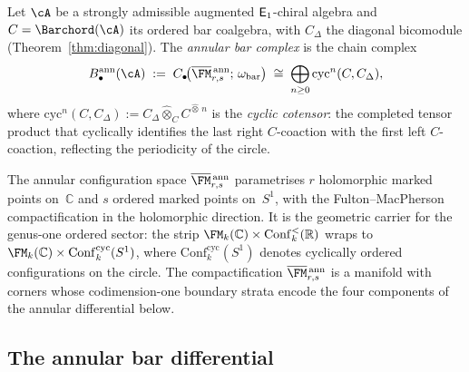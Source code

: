 \begin{definition}%
\ClaimStatusProvedHere
\label{def:annular-bar}%
%
%
Let $\cA$ be a strongly admissible augmented $\mathsf{E}_1$-chiral
algebra and $C=\Barchord(\cA)$ its ordered
bar coalgebra, with $C_\Delta$ the diagonal bicomodule
(Theorem~\ref{thm:diagonal}).
The \emph{annular bar complex} is the chain complex
\[
B^{\mathrm{ann}}_\bullet(\cA)
\;:=\;
C_\bullet\!\bigl(
 \overline{\FM}{}^{\,\mathrm{ann}}_{r,s};\,
 \omega_{\mathrm{bar}}
\bigr)
\;\cong\;
\bigoplus_{n\ge 0}
 \mathrm{cyc}^n(C,C_\Delta),
\]
where $\mathrm{cyc}^n(C,C_\Delta):=
C_\Delta\widehat\otimes_C C^{\widehat\otimes\,n}$ is the
\emph{cyclic cotensor}:
the completed tensor product that cyclically identifies the
last right $C$-coaction with the first left $C$-coaction,
reflecting the periodicity of the circle.
\end{definition}

The annular configuration space
$\overline{\FM}{}^{\,\mathrm{ann}}_{r,s}$ parametrises
$r$ holomorphic marked points on~$\mathbb{C}$ and $s$ ordered
marked points on~$S^1$, with the Fulton--MacPherson
compactification in the holomorphic direction. It is the
geometric carrier for the genus-one ordered sector: the strip
$\FM_k(\mathbb{C})\times\mathrm{Conf}_k^{<}(\mathbb{R})$ wraps to
$\FM_k(\mathbb{C})\times\mathrm{Conf}_k^{\mathrm{cyc}}(S^1)$,
where $\mathrm{Conf}_k^{\mathrm{cyc}}(S^1)$ denotes cyclically
ordered configurations on the circle. The compactification
$\overline{\FM}{}^{\,\mathrm{ann}}_{r,s}$ is a manifold with
corners whose codimension-one boundary strata encode the four
components of the annular differential below.

\subsection{The annular bar differential}


